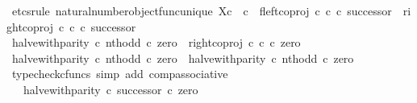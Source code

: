 \begin{isabellebody}
%
\isadelimproof
%
\endisadelimproof
%
\isatagproof
{}\isamarkupfalse%
\ {\isacharparenleft}{\kern0pt}etcs{\isacharunderscore}{\kern0pt}rule\ natural{\isacharunderscore}{\kern0pt}number{\isacharunderscore}{\kern0pt}object{\isacharunderscore}{\kern0pt}func{\isacharunderscore}{\kern0pt}unique{\isacharbrackleft}{\kern0pt}\ X{\isacharequal}{\kern0pt}{\isachardoublequoteopen}{\isasymnat}\isactrlsub c\ {\isasymCoprod}\ {\isasymnat}\isactrlsub c{\isachardoublequoteclose}{\isacharcomma}{\kern0pt}\ \ f{\isacharequal}{\kern0pt}{\isachardoublequoteopen}{\isacharparenleft}{\kern0pt}left{\isacharunderscore}{\kern0pt}coproj\ {\isasymnat}\isactrlsub c\ {\isasymnat}\isactrlsub c\ {\isasymcirc}\isactrlsub c\ successor{\isacharparenright}{\kern0pt}\ {\isasymamalg}\ {\isacharparenleft}{\kern0pt}right{\isacharunderscore}{\kern0pt}coproj\ {\isasymnat}\isactrlsub c\ {\isasymnat}\isactrlsub c\ {\isasymcirc}\isactrlsub c\ successor{\isacharparenright}{\kern0pt}{\isachardoublequoteclose}{\isacharbrackright}{\kern0pt}{\isacharparenright}{\kern0pt}\isanewline
\ \ \isamarkupfalse%
\ {\isachardoublequoteopen}{\isacharparenleft}{\kern0pt}halve{\isacharunderscore}{\kern0pt}with{\isacharunderscore}{\kern0pt}parity\ {\isasymcirc}\isactrlsub c\ nth{\isacharunderscore}{\kern0pt}odd{\isacharparenright}{\kern0pt}\ {\isasymcirc}\isactrlsub c\ zero\ {\isacharequal}{\kern0pt}\ right{\isacharunderscore}{\kern0pt}coproj\ {\isasymnat}\isactrlsub c\ {\isasymnat}\isactrlsub c\ {\isasymcirc}\isactrlsub c\ zero{\isachardoublequoteclose}\isanewline
\ \ \isamarkupfalse%
\ {\isacharminus}{\kern0pt}\isanewline
\ \ \ \ \isamarkupfalse%
\ {\isachardoublequoteopen}{\isacharparenleft}{\kern0pt}halve{\isacharunderscore}{\kern0pt}with{\isacharunderscore}{\kern0pt}parity\ {\isasymcirc}\isactrlsub c\ nth{\isacharunderscore}{\kern0pt}odd{\isacharparenright}{\kern0pt}\ {\isasymcirc}\isactrlsub c\ zero\ {\isacharequal}{\kern0pt}\ halve{\isacharunderscore}{\kern0pt}with{\isacharunderscore}{\kern0pt}parity\ {\isasymcirc}\isactrlsub c\ nth{\isacharunderscore}{\kern0pt}odd\ {\isasymcirc}\isactrlsub c\ zero{\isachardoublequoteclose}\isanewline
\ \ \ \ \ \ \isamarkupfalse%
\ {\isacharparenleft}{\kern0pt}typecheck{\isacharunderscore}{\kern0pt}cfuncs{\isacharcomma}{\kern0pt}\ simp\ add{\isacharcolon}{\kern0pt}\ comp{\isacharunderscore}{\kern0pt}associative{}{\isacharparenright}{\kern0pt}\isanewline
\ \ \ \ \isamarkupfalse%
\ \isamarkupfalse%
\ {\isachardoublequoteopen}{\isachardot}{\kern0pt}{\isachardot}{\kern0pt}{\isachardot}{\kern0pt}\ {\isacharequal}{\kern0pt}\ halve{\isacharunderscore}{\kern0pt}with{\isacharunderscore}{\kern0pt}parity\ {\isasymcirc}\isactrlsub c\ successor\ {\isasymcirc}\isactrlsub c\ zero{\isachardoublequoteclose}\isanewline

\end{isabellebody}
